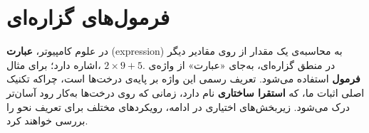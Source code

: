 \section*{ فرمول‌های گزاره‌ای}

  در علوم کامپیوتر، \textbf{عبارت} (expression) به محاسبه‌ی یک مقدار از روی مقادیر دیگر اشاره دارد؛ برای مثال، ‎$2 \times 9 + 5$‎. در منطق گزاره‌ای، به‌جای «عبارت» از واژه‌ی \textbf{فرمول} استفاده می‌شود. تعریف رسمی این واژه بر پایه‌ی درخت‌ها است، چراکه تکنیک اصلی اثبات ما، که \textbf{استقرا ساختاری} نام دارد، زمانی که روی درخت‌ها به‌کار رود آسان‌تر درک می‌شود. زیربخش‌های اختیاری در ادامه، رویکردهای مختلف برای تعریف نحو را بررسی خواهند کرد.






